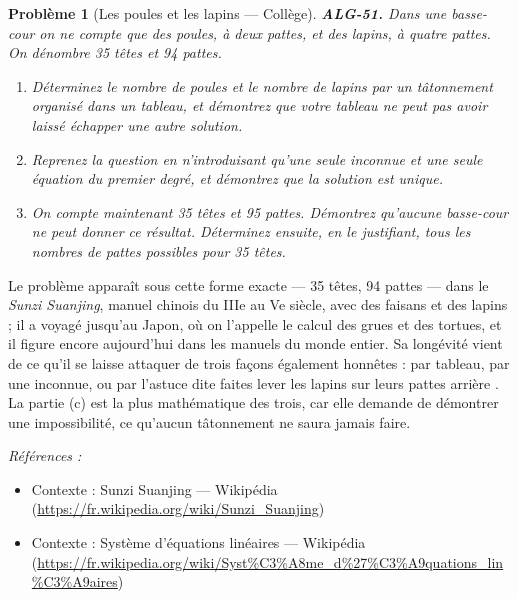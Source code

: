 \documentclass[11pt]{article}
\newtheorem{problem}{Problème}
\newenvironment{refs}{\par\small\noindent\emph{Références :}\begin{itemize}\setlength\itemsep{0pt}}{\end{itemize}\normalsize}
\begin{document}
\bigskip

\begin{problem}[{Les poules et les lapins --- Collège}]
\textbf{ALG-51.} Dans une basse-cour on ne compte que des poules, à deux pattes, et des lapins,
à quatre pattes. On dénombre 35 têtes et 94 pattes.
\begin{enumerate}
\item[(a)] Déterminez le nombre de poules et le nombre de lapins par un tâtonnement organisé dans un
tableau, et démontrez que votre tableau ne peut pas avoir laissé échapper une autre solution.
\item[(b)] Reprenez la question en n'introduisant qu'une seule inconnue et une seule équation du premier
degré, et démontrez que la solution est unique.
\item[(c)] On compte maintenant 35 têtes et 95 pattes. Démontrez qu'aucune basse-cour ne peut donner ce
résultat. Déterminez ensuite, en le justifiant, tous les nombres de pattes possibles pour 35
têtes.
\end{enumerate}

\end{problem}

\noindent Le problème apparaît sous cette forme exacte --- 35 têtes, 94 pattes --- dans le
\textit{Sunzi Suanjing}, manuel chinois du IIIe au Ve siècle, avec des faisans
et des lapins ; il a voyagé jusqu'au Japon, où on l'appelle le calcul des grues et des tortues, et
il figure encore aujourd'hui dans les manuels du monde entier. Sa longévité vient de ce qu'il se
laisse attaquer de trois façons également honnêtes : par tableau, par une inconnue, ou par
l'astuce dite \og{} faites lever les lapins sur leurs pattes arrière \fg{}. La partie (c) est la plus
mathématique des trois, car elle demande de démontrer une impossibilité, ce qu'aucun tâtonnement
ne saura jamais faire.

\begin{refs}
\item Contexte : Sunzi Suanjing --- Wikipédia (\url{https://fr.wikipedia.org/wiki/Sunzi_Suanjing})
\item Contexte : Système d'équations linéaires --- Wikipédia (\url{https://fr.wikipedia.org/wiki/Syst%C3%A8me_d%27%C3%A9quations_lin%C3%A9aires})
\end{refs}

\bigskip
\end{document}
